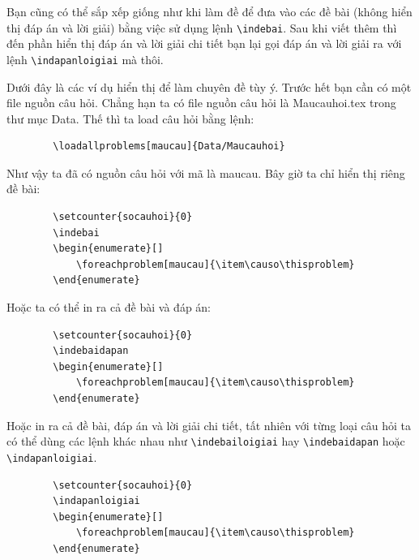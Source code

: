 	Bạn cũng có thể sắp xếp giống như khi làm đề để đưa vào các đề bài (không hiển thị đáp án và lời giải) bằng việc sử dụng lệnh \verb'\indebai'. Sau khi viết thêm thì đến phần hiển thị đáp án và lời giải chi tiết bạn lại gọi đáp án và lời giải ra với lệnh \verb'\indapanloigiai' mà thôi.
	
	Dưới đây là các ví dụ hiển thị để làm chuyên đề tùy ý. Trước hết bạn cần có một file nguồn câu hỏi. Chẳng hạn ta có file nguồn câu hỏi là Maucauhoi.tex trong thư mục Data. Thế thì ta load câu hỏi bằng lệnh:
	
	\begin{verbatim}
		\loadallproblems[maucau]{Data/Maucauhoi}
	\end{verbatim}
	
	
	Như vậy ta đã có nguồn câu hỏi với mã là maucau. Bây giờ ta chỉ hiển thị riêng đề bài:
	
	\begin{verbatim}
		\setcounter{socauhoi}{0}
		\indebai
		\begin{enumerate}[]
			\foreachproblem[maucau]{\item\causo\thisproblem}
		\end{enumerate}
	\end{verbatim}
	
	\setcounter{socauhoi}{0}
	\indebai
	\begin{enumerate}[]
		\foreachproblem[maucau]{\item\causo\thisproblem}
	\end{enumerate}
	
	Hoặc ta có thể in ra cả đề bài và đáp án:
	
	\begin{verbatim}
		\setcounter{socauhoi}{0}
		\indebaidapan
		\begin{enumerate}[]
			\foreachproblem[maucau]{\item\causo\thisproblem}
		\end{enumerate}
	\end{verbatim}
	
	\setcounter{socauhoi}{0}
	\indebaidapan
	\begin{enumerate}[]
		\foreachproblem[maucau]{\item\causo\thisproblem}
	\end{enumerate}
	
	Hoặc in ra cả đề bài, đáp án và lời giải chi tiết, tất nhiên với từng loại câu hỏi ta có thể dùng các lệnh khác nhau như \verb'\indebailoigiai' hay \verb'\indebaidapan' hoặc \verb'\indapanloigiai'.
	\begin{verbatim}
		\setcounter{socauhoi}{0}
		\indapanloigiai
		\begin{enumerate}[]
			\foreachproblem[maucau]{\item\causo\thisproblem}
		\end{enumerate}
	\end{verbatim}
	
